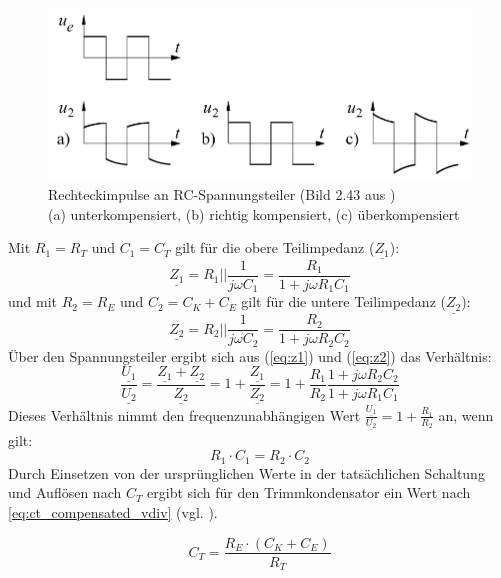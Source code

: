 \documentclass[a4paper, portrait, 12pt]{scrartcl} %
\begin{document}
\begin{figure}[H]
	\centering
		\includegraphics[scale=0.5]{freq_compensated_time_schruefer.png} 
		\caption{\centering Rechteckimpulse an RC-Spannungsteiler (Bild 2.43 aus \cite[S. 106]{Schruefer2022})\\ \footnotesize (a) unterkompensiert, (b) richtig kompensiert, (c) überkompensiert}
	\label{fig:freq_compensated_time}
\end{figure}


Mit $R_1=R_T$ und $C_1=C_T$ gilt für die obere Teilimpedanz ($\underline{Z_1}$):
\begin{equation}
	\underline{Z_1}=R_1||\frac{1}{j\omega C_1}=\frac{R_1}{1+j\omega R_1 C_1}
	\label{eq:z1}
\end{equation}
und mit $R_2=R_E$ und $C_2=C_K+C_E$ gilt für die untere Teilimpedanz ($\underline{Z_2}$):
\begin{equation}
	\underline{Z_2}=R_2||\frac{1}{j\omega C_2}=\frac{R_2}{1+j\omega R_2 C_2}
	\label{eq:z2}
\end{equation}
Über den Spannungsteiler ergibt sich aus (\ref{eq:z1}) und (\ref{eq:z2}) das Verhältnis:
\begin{equation}
	\frac{\underline{U_1}}{\underline{U_2}}=\frac{\underline{Z_1}+\underline{Z_2}}{\underline{Z_2}}=1+\frac{\underline{Z_1}}{\underline{Z_2}}=1+\frac{R_1}{R_2}\frac{1+j\omega R_2 C_2}{1+j\omega R_1 C_1}
	\label{eq:comp_vdiv}
\end{equation}
Dieses Verhältnis nimmt den frequenzunabhängigen Wert $\frac{\underline{U_1}}{\underline{U_2}}=1+\frac{R_1}{R_2}$ an, wenn gilt:
\begin{equation}
	R_1\cdot C_1=R_2\cdot C_2
\end{equation}
Durch Einsetzen von der ursprünglichen Werte in der tatsächlichen Schaltung und Auflösen nach $C_T$ ergibt sich für den Trimmkondensator ein Wert nach \autoref{eq:ct_compensated_vdiv} (vgl. \cite[S. 104-106]{Schruefer2022}).

\begin{equation}
	C_T=\frac{R_E\cdot (C_K+C_E)}{R_T}
	\label{eq:ct_compensated_vdiv}
\end{equation}
\end{document}
